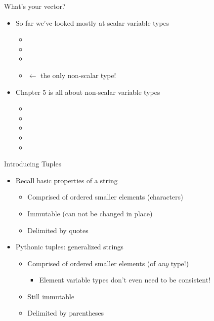 \documentclass[pdf, aspectratio=169, 12pt]{beamer}
\begin{document}
\begin{frame}{What's your vector?}
	\begin{itemize}
		\item So far we've looked mostly at scalar variable types
			\begin{itemize}
				\item {}
				\item {}
				\item {}
				\item {} $\leftarrow$ the only non-scalar type!
			\end{itemize}
		\item Chapter 5 is all about non-scalar variable types
			\begin{itemize}
				\item {}
				\item {}
				\item {}
				\item {}
				\item {}
			\end{itemize}
	\end{itemize}
\end{frame}

\begin{frame}{Introducing Tuples}
	\begin{itemize}
		\item<+-> Recall basic properties of a string
			\begin{itemize}
				\item Comprised of ordered smaller elements (characters)
				\item Immutable (can not be changed in place)
				\item Delimited by quotes 
			\end{itemize}
		\item<+-> Pythonic tuples: generalized strings
			\begin{itemize}
				\item Comprised of ordered smaller elements (of \emph{any} type!)
					\begin{itemize}
						\item Element variable types don't even need to be consistent!
					\end{itemize}
					
				\item Still immutable
				\item Delimited by parentheses
			\end{itemize}
	\end{itemize}
\end{frame}
\end{document}
